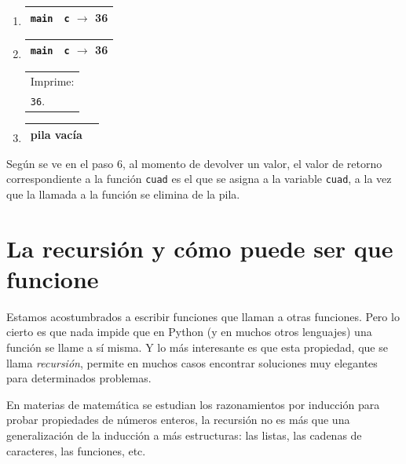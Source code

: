 \begin{enumerate}
\item {}
	\begin{tabular}{r|l|}
	\hline
	\currentframe \verb|main|&\verb|c| $\rightarrow$ 36\\
	\hline
	\end{tabular}

\item {}
	\begin{tabular}{r|l|}
	\hline
	\currentframe \verb|main|&\verb|c| $\rightarrow$ 36\\
	\hline
	\end{tabular}
	\begin{tabular}{l}
	Imprime:\\
	\verb|36|.
	\end{tabular}

\item \makebox[5cm][l]{}
	\begin{tabular}{r|l|}
	\hline
	\currentframe pila vacía\\
	\hline
	\end{tabular}

\end{enumerate}

Según se ve en el paso 6, al momento de devolver un valor, el valor de
retorno correspondiente a la función \lstinline!cuad! es el que se
asigna a la variable \lstinline!cuad!, a la vez que la llamada a la función
se elimina de la pila.

\newpage
\section{La recursión y cómo puede ser que funcione}

Estamos acostumbrados a escribir funciones que llaman a otras funciones.
Pero lo cierto es que nada impide que en Python (y en muchos otros
lenguajes) una función se llame a sí misma. Y lo más interesante es que
esta propiedad, que se llama \emph{recursión}, permite en muchos casos
encontrar soluciones muy elegantes para determinados problemas.

En materias de matemática se estudian los razonamientos por inducción para
probar propiedades de números enteros, la recursión no es más que una
generalización de la inducción a más estructuras: las listas, las cadenas
de caracteres, las funciones, etc.

